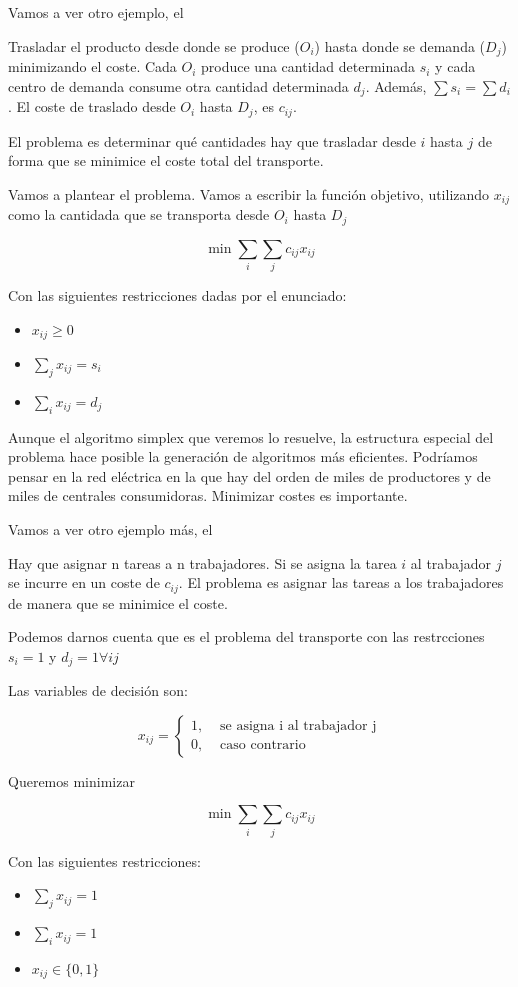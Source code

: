 \documentclass[palatino,nochap]{apuntes}
\begin{document}
Vamos a ver otro ejemplo, el 
\begin{example}
Trasladar el producto desde donde se produce ($O_i$) hasta donde se demanda ($D_j$) minimizando el coste. 
Cada $O_i$ produce una cantidad determinada $s_i$ y cada centro de demanda consume otra cantidad determinada $d_j$.
Además, $\sum s_i = \sum d_i$.
El coste de traslado desde $O_i$ hasta $D_j$, es $c_{ij}$. 

El problema es determinar qué cantidades hay que trasladar desde $i$ hasta $j$ de forma que se minimice el coste total del transporte.


Vamos a plantear el problema. Vamos a escribir la función objetivo, utilizando $x_{ij}$ como la cantidada que se transporta desde $O_i$ hasta $D_j$

\[\min \sum_i \sum_j c_{ij}x_{ij} \]

Con las siguientes restricciones dadas por el enunciado:

\begin{itemize}
	\item $x_{ij} \geq 0$
	\item $\displaystyle\sum_j x_{ij} = s_i$
	\item $\displaystyle\sum_i x_{ij} = d_j$
\end{itemize}

Aunque el algoritmo simplex que veremos lo resuelve, la estructura especial del problema hace posible la generación de algoritmos más eficientes. 
Podríamos pensar en la red eléctrica en la que hay del orden de miles de productores y de miles de centrales consumidoras. 
Minimizar costes es importante.
\end{example}

Vamos a ver otro ejemplo más, el 
\begin{example}
Hay que asignar n tareas a n trabajadores. Si se asigna la tarea $i$ al
trabajador $j$ se incurre en un coste de $c_{ij}$.
El problema es asignar las tareas a los trabajadores de manera que se minimice el coste.

Podemos darnos cuenta que es el problema del transporte con las restrcciones $s_i = 1$ y $d_j = 1 ∀ij$

Las variables de decisión son:

\[x_{ij} = \left\{ \begin{array}{cc} 1, & \text{ se asigna i al trabajador j}\\0, & \text{ caso contrario}\end{array} \right. \]

Queremos minimizar

\[
\min \sum_i \sum_j c_{ij} x_{ij}
\]

Con las siguientes restricciones:

\begin{itemize}
	\item $\displaystyle\sum_j x_{ij} = 1$
	\item $\displaystyle\sum_i x_{ij} = 1$
	\item $x_{ij}\in\{0,1\}$
\end{itemize}

\end{example}
\end{document}

